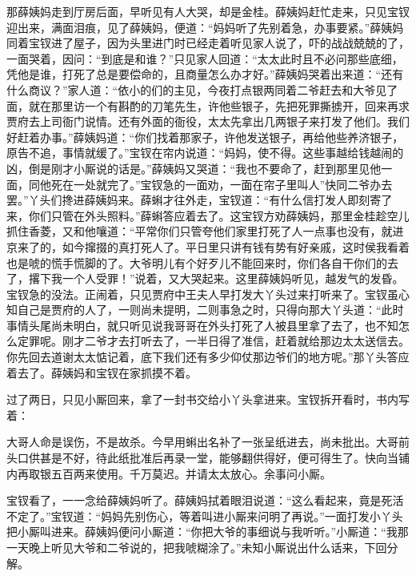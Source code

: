 \begin{parag}
    那薛姨妈走到厅房后面，早听见有人大哭，却是金桂。薛姨妈赶忙走来，只见宝钗迎出来，满面泪痕，见了薛姨妈，便道：“妈妈听了先别着急，办事要紧。”薛姨妈同着宝钗进了屋子，因为头里进门时已经走着听见家人说了，吓的战战兢兢的了，一面哭着，因问：“到底是和谁？”只见家人回道：“太太此时且不必问那些底细，凭他是谁，打死了总是要偿命的，且商量怎么办才好。”薛姨妈哭着出来道：“还有什么商议？”家人道：“依小的们的主见，今夜打点银两同着二爷赶去和大爷见了面，就在那里访一个有斟酌的刀笔先生，许他些银子，先把死罪撕掳开，回来再求贾府去上司衙门说情。还有外面的衙役，太太先拿出几两银子来打发了他们。我们好赶着办事。”薛姨妈道：“你们找着那家子，许他发送银子，再给他些养济银子，原告不追，事情就缓了。”宝钗在帘内说道：“妈妈，使不得。这些事越给钱越闹的凶，倒是刚才小厮说的话是。”薛姨妈又哭道：“我也不要命了，赶到那里见他一面，同他死在一处就完了。”宝钗急的一面劝，一面在帘子里叫人”快同二爷办去罢。”丫头们搀进薛姨妈来。薛蝌才往外走，宝钗道：“有什么信打发人即刻寄了来，你们只管在外头照料。”薛蝌答应着去了。这宝钗方劝薛姨妈，那里金桂趁空儿抓住香菱，又和他嚷道：“平常你们只管夸他们家里打死了人一点事也没有，就进京来了的，如今撺掇的真打死人了。平日里只讲有钱有势有好亲戚，这时侯我看着也是唬的慌手慌脚的了。大爷明儿有个好歹儿不能回来时，你们各自干你们的去了，撂下我一个人受罪！”说着，又大哭起来。这里薛姨妈听见，越发气的发昏。宝钗急的没法。正闹着，只见贾府中王夫人早打发大丫头过来打听来了。宝钗虽心知自己是贾府的人了，一则尚未提明，二则事急之时，只得向那大丫头道：“此时事情头尾尚未明白，就只听见说我哥哥在外头打死了人被县里拿了去了，也不知怎么定罪呢。刚才二爷才去打听去了，一半日得了准信，赶着就给那边太太送信去。你先回去道谢太太惦记着，底下我们还有多少仰仗那边爷们的地方呢。”那丫头答应着去了。薛姨妈和宝钗在家抓摸不着。
\end{parag}


\begin{parag}
    过了两日，只见小厮回来，拿了一封书交给小丫头拿进来。宝钗拆开看时，书内写着：
\end{parag}


\begin{qute2sp}
    大哥人命是误伤，不是故杀。今早用蝌出名补了一张呈纸进去，尚未批出。大哥前头口供甚是不好，待此纸批准后再录一堂，能够翻供得好，便可得生了。快向当铺内再取银五百两来使用。千万莫迟。并请太太放心。余事问小厮。
\end{qute2sp}


\begin{parag}
    宝钗看了，一一念给薛姨妈听了。薛姨妈拭着眼泪说道：“这么看起来，竟是死活不定了。”宝钗道：“妈妈先别伤心，等着叫进小厮来问明了再说。”一面打发小丫头把小厮叫进来。薛姨妈便问小厮道：“你把大爷的事细说与我听听。”小厮道：“我那一天晚上听见大爷和二爷说的，把我唬糊涂了。”未知小厮说出什么话来，下回分解。
\end{parag}